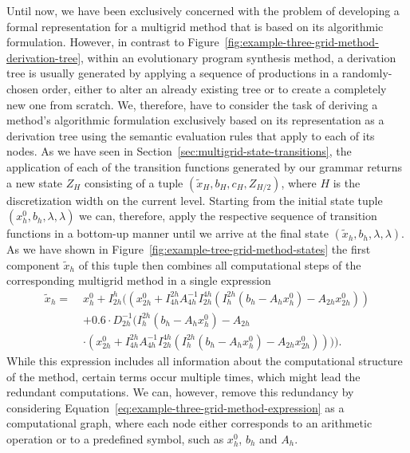 Until now, we have been exclusively concerned with the problem of developing a formal representation for a multigrid method that is based on its algorithmic formulation.
However, in contrast to Figure~\ref{fig:example-three-grid-method-derivation-tree}, within an evolutionary program synthesis method, a derivation tree is usually generated by applying a sequence of productions in a randomly-chosen order, either to alter an already existing tree or to create a completely new one from scratch.
We, therefore, have to consider the task of deriving a method's algorithmic formulation exclusively based on its representation as a derivation tree using the semantic evaluation rules that apply to each of its nodes.
As we have seen in Section~\ref{sec:multigrid-state-transitions}, the application of each of the transition functions generated by our grammar returns a new state $Z_H$ consisting of a tuple $\left( \tilde{x}_{H}, b_{H}, c_{H}, Z_{H/2}\right)$, where $H$ is the discretization width on the current level.
Starting from the initial state tuple $\left(x_{h}^0, b_{h}, \lambda, \lambda\right)$ we can, therefore, apply the respective sequence of transition functions in a bottom-up manner until we arrive at the final state $\left(\tilde{x}_{h}, b_{h}, \lambda, \lambda\right)$.
As we have shown in Figure~\ref{fig:example-tree-grid-method-states} the first component $\tilde{x}_{h}$ of this tuple then combines all computational steps of the corresponding multigrid method in a single expression
\begin{equation}
	\begin{split}
		\tilde{x}_h = \; & x_{h}^0 + I_{2h}^h ((x_{2h}^0 + I_{4h}^{2h} A_{4h}^{-1} I_{2h}^{4h} (I_{h}^{2h}(b_{h} - A_h x_{h}^0) - A_{2h} x_{2h}^0)) \\
		& + 0.6 \cdot D_{2h}^{-1} (I_{h}^{2h}(b_{h} - A_h x_{h}^0) - A_{2h} \\
		& \cdot (x_{2h}^0 + I_{4h}^{2h} A_{4h}^{-1} I_{2h}^{4h} (I_{h}^{2h}(b_{h} - A_h x_{h}^0) - A_{2h} x_{2h}^0)))).
		\label{eq:example-three-grid-method-expression}
	\end{split}
\end{equation}
While this expression includes all information about the computational structure of the method, certain terms occur multiple times, which might lead the redundant computations.
We can, however, remove this redundancy by considering Equation~\eqref{eq:example-three-grid-method-expression} as a computational graph, where each node either corresponds to an arithmetic operation or to a predefined symbol, such as $x^0_h$, $b_h$ and $A_h$.
